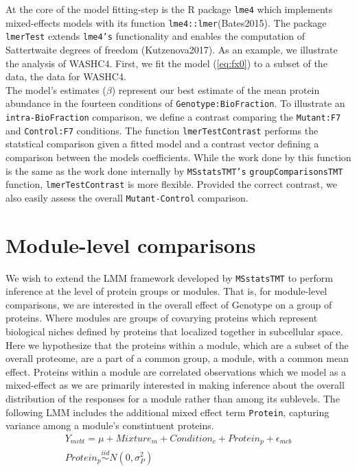 \documentclass[11pt]{elife}\usepackage[]{graphicx}\usepackage[]{color}
\begin{document}
At the core of the model fitting-step is the R package \texttt{lme4} which
implements mixed-effects models with its function \texttt{lme4::lmer}(Bates2015). The
package \texttt{lmerTest} extends \texttt{lme4's} functionality and enables the
computation of Sattertwaite degrees of freedom (Kutzenova2017). As an example,
we illustrate the analysis of WASHC4. First, we fit the model (\ref{eq:fx0}) to
a subset of the data, the data for WASHC4.\\





The model's estimates ($\beta$) represent our best estimate of the mean protein
abundance in the fourteen conditions of \texttt{Genotype:BioFraction}. 
To illustrate an \texttt{intra-BioFraction} comparison, we 
define a contrast comparing the \texttt{Mutant:F7} and \texttt{Control:F7}
conditions. The function \texttt{lmerTestContrast} performs the statstical comparison given
a fitted model and a contrast vector defining a comparison between the models
coefficients. While the work done by this function 
is the same as the work done internally by \texttt{MSstatsTMT's}
\texttt{groupComparisonsTMT} function, \texttt{lmerTestContrast} is more
flexible. Provided the correct contrast, we also easily assess the overall
\texttt{Mutant-Control} comparison.\\


\section{Module-level comparisons}

We wish to extend the LMM framework developed by \texttt{MSstatsTMT} to perform 
inference at the level of protein groups or modules.
That is, for module-level comparisons, we are interested in the overall effect 
of Genotype on a group of proteins. Where modules are groups of covarying 
proteins which represent biological niches defined by proteins that 
localized together in subcellular space.\\

Here we hypothesize that the proteins within a module, which are a subset of the
overall proteome,  are a part of a common group, a module, with a common mean
effect. Proteins within a module are correlated observations which we model as a
mixed-effect as we are primarily interested in making inference about the
overall distribution of the responses for a module rather than among its
sublevels. The following LMM includes the additional mixed effect term
\texttt{Protein}, capturing variance among a module's constintuent proteins.
\begin{equation} 
  \begin{gathered}\label{eq:fx1} %
	Y_{mcbt} = \mu + Mixture_m + Condition_c + Protein_p + \epsilon_{mcb}\\
	Protein_p \stackrel{iid}{\sim} N(0,\sigma^2_P) \\
  \end{gathered}
\end{equation}
\end{document}
